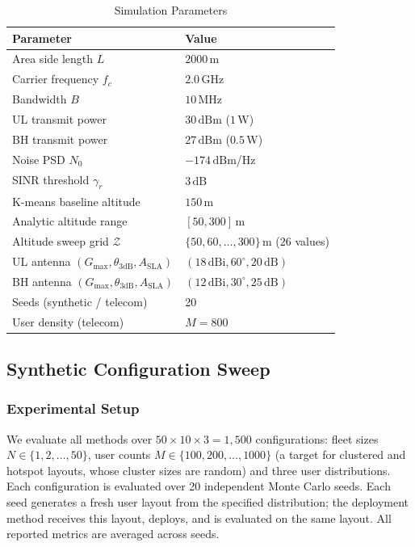\documentclass[conference]{IEEEtran}
\newcommand{\dB}{\,\mathrm{dB}}
\newcommand{\dBi}{\,\mathrm{dBi}}
\newcommand{\dBm}{\,\mathrm{dBm}}
\begin{document}
\begin{table}[t]
\centering
\caption{Simulation Parameters}
\label{tab:params}
\begin{tabular}{@{}ll@{}}
\toprule
Parameter & Value \\
\midrule
Area side length $L$ & $2000$\,m \\
Carrier frequency $f_c$ & $2.0$\,GHz \\
Bandwidth $B$ & $10$\,MHz \\
UL transmit power & $30\dBm$ ($1$\,W) \\
BH transmit power & $27\dBm$ ($0.5$\,W) \\
Noise PSD $N_0$ & $-174\dBm$/Hz \\
SINR threshold $\gamma_r$ & $3\dB$ \\
K-means baseline altitude & $150$\,m \\
Analytic altitude range & $[50, 300]$\,m \\
Altitude sweep grid $\mathcal{Z}$ & $\{50, 60, \ldots, 300\}$\,m ($26$ values) \\
UL antenna $(G_{\max}, \theta_{3\mathrm{dB}}, A_{\mathrm{SLA}})$ & $(18\dBi, 60^\circ, 20\dB)$ \\
BH antenna $(G_{\max}, \theta_{3\mathrm{dB}}, A_{\mathrm{SLA}})$ & $(12\dBi, 30^\circ, 25\dB)$ \\
Seeds (synthetic / telecom) & 20 \\
User density (telecom) & $M = 800$ \\
\bottomrule
\end{tabular}
\end{table}

\subsection{Synthetic Configuration Sweep}
\label{sec:results_synthetic}

\subsubsection{Experimental Setup}

We evaluate all methods over $50 \times 10 \times 3 = 1{,}500$ configurations: fleet sizes $N \in \{1, 2, \ldots, 50\}$, user counts $M \in \{100, 200, \ldots, 1000\}$ (a target for clustered and hotspot layouts, whose cluster sizes are random) and three user distributions.
Each configuration is evaluated over 20 independent Monte Carlo seeds. Each seed generates a fresh user layout from the specified distribution; the deployment method receives this layout, deploys, and is evaluated on the same layout. All reported metrics are averaged across seeds.
\end{document}
